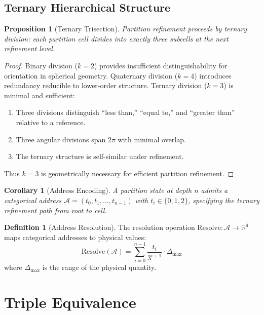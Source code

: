 \documentclass[10pt,twocolumn]{article}
\theoremstyle{plain}
\newtheorem{proposition}[theorem]{Proposition}
\newtheorem{corollary}[theorem]{Corollary}
\theoremstyle{definition}
\newtheorem{definition}[theorem]{Definition}
\theoremstyle{remark}
\newcommand{\R}{\mathbb{R}}
\begin{document}
\subsection{Ternary Hierarchical Structure}

\begin{proposition}[Ternary Trisection]
\label{prop:ternary}
Partition refinement proceeds by ternary division: each partition cell divides into exactly three subcells at the next refinement level.
\end{proposition}

\begin{proof}
Binary division ($k=2$) provides insufficient distinguishability for orientation in spherical geometry. Quaternary division ($k=4$) introduces redundancy reducible to lower-order structure. Ternary division ($k=3$) is minimal and sufficient:
\begin{enumerate}[label=(\roman*)]
\item Three divisions distinguish ``less than,'' ``equal to,'' and ``greater than'' relative to a reference.
\item Three angular divisions span $2\pi$ with minimal overlap.
\item The ternary structure is self-similar under refinement.
\end{enumerate}
Thus $k = 3$ is geometrically necessary for efficient partition refinement.
\end{proof}

\begin{corollary}[Address Encoding]
\label{cor:address}
A partition state at depth $n$ admits a categorical address $\mathcal{A} = (t_0, t_1, \ldots, t_{n-1})$ with $t_i \in \{0, 1, 2\}$, specifying the ternary refinement path from root to cell.
\end{corollary}

\begin{definition}[Address Resolution]
\label{def:resolve}
The resolution operation $\mathrm{Resolve}: \mathcal{A} \to \R^d$ maps categorical addresses to physical values:
\begin{equation}
\mathrm{Resolve}(\mathcal{A}) = \sum_{i=0}^{n-1} \frac{t_i}{3^{i+1}} \cdot \Delta_{\max}
\label{eq:resolve}
\end{equation}
where $\Delta_{\max}$ is the range of the physical quantity.
\end{definition}

\section{Triple Equivalence}
\label{sec:triple}
\end{document}
